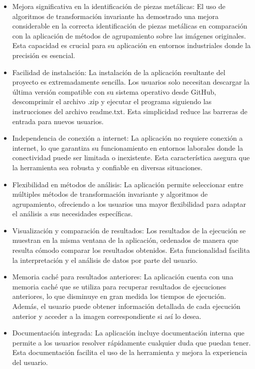 \begin{itemize}
    \item Mejora significativa en la identificación de piezas metálicas: El uso de algoritmos de transformación invariante ha demostrado una mejora considerable en la correcta identificación de piezas metálicas en comparación con la aplicación de métodos de agrupamiento sobre las imágenes originales. Esta capacidad es crucial para su aplicación en entornos industriales donde la precisión es esencial.
    \item Facilidad de instalación: La instalación de la aplicación resultante del proyecto es extremadamente sencilla. Los usuarios solo necesitan descargar la última versión compatible con su sistema operativo desde GitHub, descomprimir el archivo .zip y ejecutar el programa siguiendo las instrucciones del archivo readme.txt. Esta simplicidad reduce las barreras de entrada para nuevos usuarios.
    \item Independencia de conexión a internet: La aplicación no requiere conexión a internet, lo que garantiza su funcionamiento en entornos laborales donde la conectividad puede ser limitada o inexistente. Esta característica asegura que la herramienta sea robusta y confiable en diversas situaciones.
    \item Flexibilidad en métodos de análisis: La aplicación permite seleccionar entre múltiples métodos de transformación invariante y algoritmos de agrupamiento, ofreciendo a los usuarios una mayor flexibilidad para adaptar el análisis a sus necesidades específicas.
    \item Visualización y comparación de resultados: Los resultados de la ejecución se muestran en la misma ventana de la aplicación, ordenados de manera que resulta cómodo comparar los resultados obtenidos. Esta funcionalidad facilita la interpretación y el análisis de datos por parte del usuario.
    \item Memoria caché para resultados anteriores: La aplicación cuenta con una memoria caché que se utiliza para recuperar resultados de ejecuciones anteriores, lo que disminuye en gran medida los tiempos de ejecución. Además, el usuario puede obtener información detallada de cada ejecución anterior y acceder a la imagen correspondiente si así lo desea.
    \item Documentación integrada: La aplicación incluye documentación interna que permite a los usuarios resolver rápidamente cualquier duda que puedan tener. Esta documentación facilita el uso de la herramienta y mejora la experiencia del usuario.
\end{itemize}

